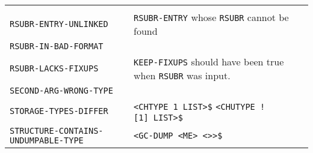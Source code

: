 \documentclass[a4paper]{scrbook}
\begin{document}
\begin{longtable}[]{@{}ll@{}}
\begin{minipage}[t]{0.36\columnwidth}
\strut
\end{minipage}\tabularnewline
\begin{minipage}[t]{0.58\columnwidth}\raggedright\strut
\texttt{RSUBR-ENTRY-UNLINKED}\strut
\end{minipage} & \begin{minipage}[t]{0.36\columnwidth}\raggedright\strut
\texttt{RSUBR-ENTRY} whose \texttt{RSUBR} cannot be found\strut
\end{minipage}\tabularnewline
\begin{minipage}[t]{0.58\columnwidth}\raggedright\strut
\texttt{RSUBR-IN-BAD-FORMAT}\strut
\end{minipage} & \begin{minipage}[t]{0.36\columnwidth}\raggedright\strut
\strut
\end{minipage}\tabularnewline
\begin{minipage}[t]{0.58\columnwidth}\raggedright\strut
\texttt{RSUBR-LACKS-FIXUPS}\strut
\end{minipage} & \begin{minipage}[t]{0.36\columnwidth}\raggedright\strut
\texttt{KEEP-FIXUPS} should have been true when \texttt{RSUBR} was input.\strut
\end{minipage}\tabularnewline
\begin{minipage}[t]{0.58\columnwidth}\raggedright\strut
\texttt{SECOND-ARG-WRONG-TYPE}\strut
\end{minipage} & \begin{minipage}[t]{0.36\columnwidth}\raggedright\strut
\strut
\end{minipage}\tabularnewline
\begin{minipage}[t]{0.58\columnwidth}\raggedright\strut
\texttt{STORAGE-TYPES-DIFFER}\strut
\end{minipage} & \begin{minipage}[t]{0.36\columnwidth}\raggedright\strut
\texttt{\textless{}CHTYPE\ 1\ LIST\textgreater{}\$}
\texttt{\textless{}CHUTYPE\ \textquotesingle{}!{[}1{]}\ LIST\textgreater{}\$}\strut
\end{minipage}\tabularnewline
\begin{minipage}[t]{0.58\columnwidth}\raggedright\strut
\texttt{STRUCTURE-CONTAINS-UNDUMPABLE-TYPE}\strut
\end{minipage} & \begin{minipage}[t]{0.36\columnwidth}\raggedright\strut
\texttt{\textless{}GC-DUMP\ \textless{}ME\textgreater{}\ \textless{}\textgreater{}\textgreater{}\$}\strut
\end{minipage}\tabularnewline

\end{longtable}
\end{document}

